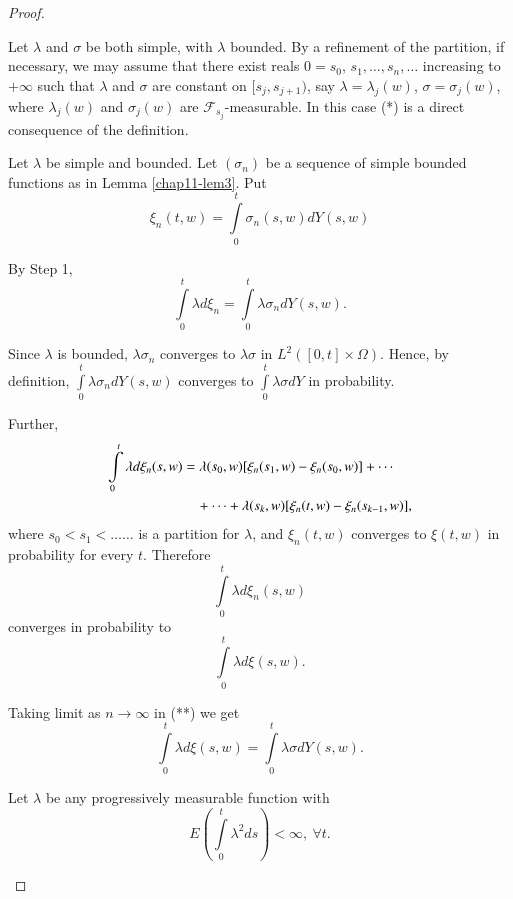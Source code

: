 \begin{proof}
\setcounter{step}{0}
\begin{step}%
Let $\lambda$ and $\sigma$ be both simple, with $\lambda$ bounded. By
a refinement of the partition, if necessary, we may assume that there
exist reals $0=s_{0}$, $s_{1},\ldots,s_{n},\ldots$ increasing to
$+\infty$ such that $\lambda$ and $\sigma$ are constant on
$[s_{j},s_{j+1})$, say $\lambda=\lambda_{j}(w)$,
  $\sigma=\sigma_{j}(w)$, where $\lambda_{j}(w)$ and $\sigma_{j}(w)$
  are $\mathscr{F}_{s_{j}}$-measurable. In this case (*) is a direct
  consequence of the definition.
\end{step}

\begin{step}%
Let $\lambda$ be simple and bounded. Let $(\sigma_{n})$ be a sequence
of simple bounded functions as in Lemma \ref{chap11-lem3}. Put
$$
\xi_{n}(t,w)=\int\limits^{t}_{0}\sigma_{n}(s,w)dY(s,w)
$$

By Step 1,
\begin{equation*}
\int\limits^{t}_{0}\lambda
d\xi_{n}=\int\limits^{t}_{0}\lambda\sigma_{n}dY(s,w).\tag{**} 
\end{equation*}\pageoriginale

Since $\lambda$ is bounded, $\lambda\sigma_{n}$ converges to
$\lambda\sigma$ in $L^{2}([0,t]\times\Omega)$. Hence, by definition,
$\int\limits^{t}_{0}\lambda\sigma_{n}dY(s,w)$ converges to
$\int\limits^{t}_{0}\lambda\sigma dY$ in probability.

Further,
\begin{align*}
 \int\limits^{t}_{0}\lambda
d\xi_{n}(s,w) &=\lambda(s_{0},w)[\xi_{n}(s_{1},w)-\xi_{n}(s_{0},w)]+\cdots\\
&\quad +\cdots+\lambda(s_{k},w)[\xi_{n}(t,w)-\xi_{n}(s_{k-1},w)],
\end{align*}
where $s_{0}<s_{1}<\ldots\ldots$ is a partition for $\lambda$, and
$\xi_{n}(t,w)$ converges to $\xi(t,w)$ in probability for every
$t$. Therefore
$$
\int\limits^{t}_{0}\lambda d\xi_{n}(s,w)
$$
converges in probability to 
$$
\int\limits^{t}_{0}\lambda d\xi(s,w).
$$

Taking limit as $n\to \infty$ in (**) we get
$$
\int\limits^{t}_{0}\lambda d\xi(s,w)=\int\limits^{t}_{0}\lambda \sigma
dY(s,w).
$$
\end{step}

\begin{step}%
Let $\lambda$ be any progressively measurable function with
$$
E(\int\limits^{t}_{0}\lambda^{2}ds)<\infty, \ \forall t.
$$ 


\end{step}
\end{proof}
